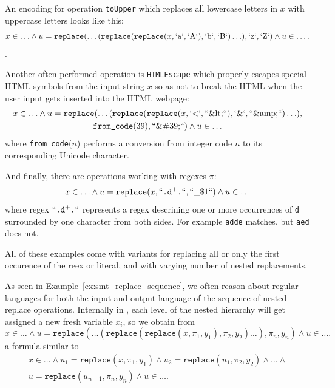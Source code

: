 \begin{example}\label{ex:smt_replace_sequence}
  An encoding for operation \texttt{toUpper} which replaces all lowercase letters in $x$ with uppercase letters looks like this:
  $$ x \in \ldots \land u = \texttt{replace}(\ldots (\texttt{replace}(\texttt{replace}(x, `\text{a}`, `\text{A}`), `\text{b}`, `\text{B}`)\ldots), `\text{z}`, `\text{Z}`)\land u \in \ldots \text{.}$$.

  Another often performed operation is \texttt{HTMLEscape} which properly escapes special HTML symbols from the input string $x$ so as not to break the HTML when the user input gets inserted into the HTML webpage:
  \begin{multline*}
  x \in \ldots \land u = \texttt{replace}(\ldots (\texttt{replace}(\texttt{replace}(x, `\text{<}`, ``\text{\&lt;}``), `\text{\&}`, ``\text{\&amp;}``)\ldots), \\
  \texttt{from\_code}(39), ``\text{\&\#39;}``)\land u \in \ldots
  \end{multline*}
  where \texttt{from\_code}($n$) performs a conversion from integer code $n$ to its corresponding Unicode character.

  And finally, there are operations working with regexes $\pi$:
  $$
    x \in \ldots \land u = \texttt{replace}(x, ``\texttt{.d}^+\texttt{.}``, ``\text{\_\$1}``)\land u \in \ldots
  $$
where regex $``\texttt{.d}^+\texttt{.}``$ represents a regex descrining one or more occurrences of \texttt{d} surrounded by one character from both sides. For example \texttt{adde} matches, but \texttt{aed} does not.

All of these examples come with variants for replacing all or only the first occurence of the reex or literal, and with varying number of nested replacements.

\end{example}

As seen in Example~\ref{ex:smt_replace_sequence}, we often reason about regular languages for both the input and output language of the sequence of nested replace operations.
Internally in \noodler, each level of the nested hierarchy will get assigned a new fresh variable $x_i$, so we obtain from
$$
x \in \ldots \land u = \texttt{replace}(\ldots (\texttt{replace}(\texttt{replace}(x, \pi_1, y_1), \pi_2, y_2)\ldots), \pi_n, y_n) \land u \in \ldots \text{.}
$$
a formula similar to
\begin{multline*}
x \in \ldots \land u_1 = \texttt{replace}(x, \pi_1, y_1) \land u_2 = \texttt{replace}(u_1, \pi_2, y_2) \land \ldots \land \\u = \texttt{replace}(u_{n-1}, \pi_n, y_n) \land u \in \ldots \text{.}
\end{multline*}

